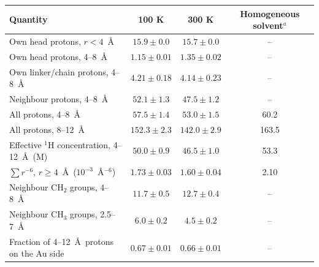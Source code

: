 \begin{tabular}{lccc}
\toprule
Quantity & 100 K & 300 K & Homogeneous solvent$^a$\\
\midrule
Own head protons, $r<4$~\AA & $15.9\pm0.0$ & $15.7\pm0.0$ & --\\
Own head protons, 4--8~\AA & $1.15\pm0.01$ & $1.35\pm0.02$ & --\\
Own linker/chain protons, 4--8~\AA & $4.21\pm0.18$ & $4.14\pm0.23$ & --\\
Neighbour protons, 4--8~\AA & $52.1\pm1.3$ & $47.5\pm1.2$ & --\\
All protons, 4--8~\AA & $57.5\pm1.4$ & $53.0\pm1.5$ & 60.2\\
All protons, 8--12~\AA & $152.3\pm2.3$ & $142.0\pm2.9$ & 163.5\\
Effective $^1$H concentration, 4--12~\AA\ (M) & $50.0\pm0.9$ & $46.5\pm1.0$ & 53.3\\
$\sum r^{-6}$, $r\geq4$~\AA\ ($10^{-3}$~\AA$^{-6}$) & $1.73\pm0.03$ & $1.60\pm0.04$ & 2.10\\
Neighbour CH$_2$ groups, 4--8~\AA & $11.7\pm0.5$ & $12.7\pm0.4$ & --\\
Neighbour CH$_3$ groups, 2.5--7~\AA & $6.0\pm0.2$ & $4.5\pm0.2$ & --\\
Fraction of 4--12~\AA\ protons on the Au side & $0.67\pm0.01$ & $0.66\pm0.01$ & --\\
\bottomrule
\end{tabular}
